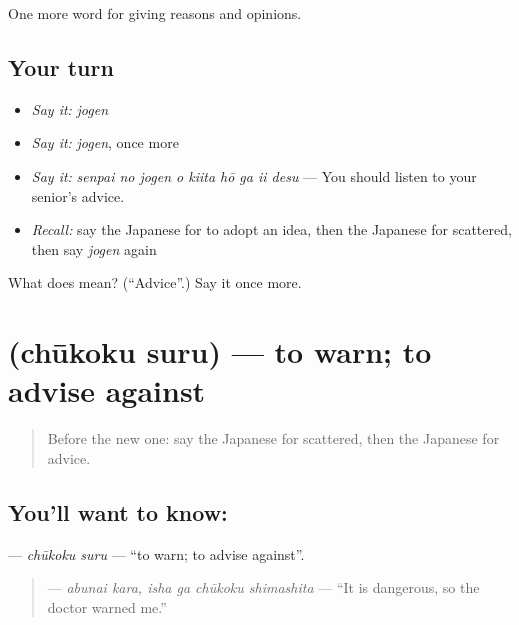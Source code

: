 \begin{grammarlens}[title={What you've built}]
One more word for giving reasons and opinions.
\end{grammarlens}

\subsection*{Your turn}
\begin{itemize}
\raggedright
  \item \emph{Say it:} \emph{jogen}
  \item \emph{Say it:} \emph{jogen}, once more
  \item \emph{Say it:} \emph{senpai no jogen o kiita hō ga ii desu} — You should listen to your senior's advice.
  \item \emph{Recall:} say the Japanese for to adopt an idea, then the Japanese for scattered, then say \emph{jogen} again
\end{itemize}

\begin{tcolorbox}[breakable,colback=teal!4,colframe=teal!35!black,title={Before you move on}]
What does  mean? (\textquotedblleft{}Advice\textquotedblright{}.) Say it once more.
\end{tcolorbox}
\section[\texorpdfstring{\ja{ちゅうこくする} (chūkoku suru)}{ちゅうこくする (chūkoku suru)}]{ (chūkoku suru) — to warn; to advise against}

\label{lesson:JA-C340-chuukoku-suru}



\begin{quote}
Before the new one: say the Japanese for scattered, then the Japanese for advice.
\end{quote}

\subsection*{You'll want to know: }
\textbf{} — \emph{chūkoku suru} — \textquotedblleft{}to warn; to advise against\textquotedblright{}.

\begin{quote}
\textbf{ } — \emph{abunai kara, isha ga chūkoku shimashita} — \textquotedblleft{}It is dangerous, so the doctor warned me.\textquotedblright{}
\end{quote}


